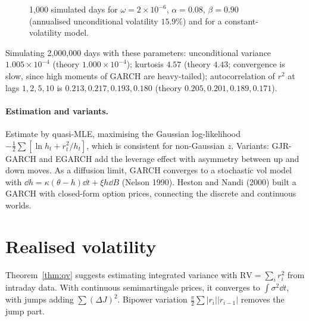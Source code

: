 \begin{figure}[t]
\centering
{}
\caption{1{,}000 simulated days for $\omega=2\times10^{-6}$, $\alpha=0.08$, $\beta=0.90$ (annualised unconditional volatility $15.9\%$) and for a constant-volatility model.}\label{fig:garch}
\end{figure}

\begin{numcheck}
Simulating 2{,}000{,}000 days with these parameters: unconditional variance $1.005\times10^{-4}$ (theory $1.000\times10^{-4}$); kurtosis $4.57$ (theory $4.43$; convergence is slow, since high moments of GARCH are heavy-tailed); autocorrelation of $r^2$ at lags $1,2,5,10$ is $0.213,0.217,0.193,0.180$ (theory $0.205,0.201,0.189,0.171$).
\end{numcheck}

\paragraph{Estimation and variants.} Estimate by quasi-MLE, maximising the Gaussian log-likelihood $-\tfrac12\sum[\ln h_t+r_t^2/h_t]$, which is consistent for non-Gaussian $z$. Variants: GJR-GARCH and EGARCH add the leverage effect with asymmetry between up and down moves. As a diffusion limit, GARCH converges to a stochastic vol model with $\dd h=\kappa(\theta-h)\dd t+\xi h\dd B$ (Nelson 1990). Heston and Nandi (2000) built a GARCH with closed-form option prices, connecting the discrete and continuous worlds.

\section{Realised volatility}

Theorem~\ref{thm:qv} suggests estimating integrated variance with $\mathrm{RV}=\sum_ir_i^2$ from intraday data. With continuous semimartingale prices, it converges to $\int\sigma^2\dd t$, with jumps adding $\sum(\Delta J)^2$. Bipower variation $\frac\pi2\sum|r_i||r_{i-1}|$ removes the jump part.

